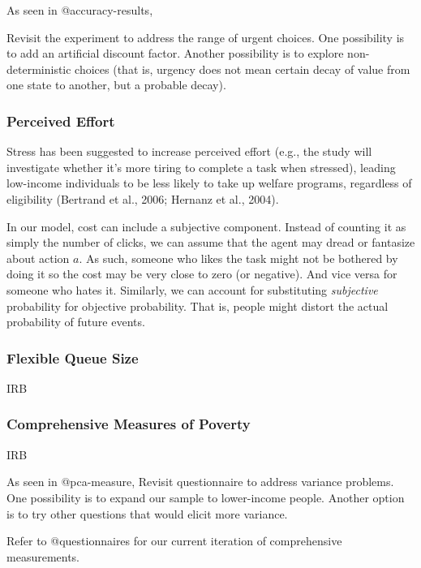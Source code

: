 As seen in @accuracy-results,

Revisit the experiment to address the range of urgent choices. One
possibility is to add an artificial discount factor. Another possibility
is to explore non-deterministic choices (that is, urgency does not mean
certain decay of value from one state to another, but a probable decay).

\hypertarget{perceived-effort}{%
\subsubsection{Perceived Effort}\label{perceived-effort}}

Stress has been suggested to increase perceived effort (e.g., the study
will investigate whether it's more tiring to complete a task when
stressed), leading low-income individuals to be less likely to take up
welfare programs, regardless of eligibility (Bertrand et al., 2006;
Hernanz et al., 2004).

In our model, cost can include a subjective component. Instead of
counting it as simply the number of clicks, we can assume that the agent
may dread or fantasize about action \(a\). As such, someone who likes
the task might not be bothered by doing it so the cost may be very close
to zero (or negative). And vice versa for someone who hates it.
Similarly, we can account for substituting \emph{subjective} probability
for objective probability. That is, people might distort the actual
probability of future events.

\hypertarget{flexible-queue-size}{%
\subsubsection{Flexible Queue Size}\label{flexible-queue-size}}

IRB

\hypertarget{comprehensive-measures-of-poverty}{%
\subsubsection{Comprehensive Measures of
Poverty}\label{comprehensive-measures-of-poverty}}

IRB

As seen in @pca-measure, Revisit questionnaire to address variance
problems. One possibility is to expand our sample to lower-income
people. Another option is to try other questions that would elicit more
variance.

Refer to @questionnaires for our current iteration of comprehensive
measurements.


